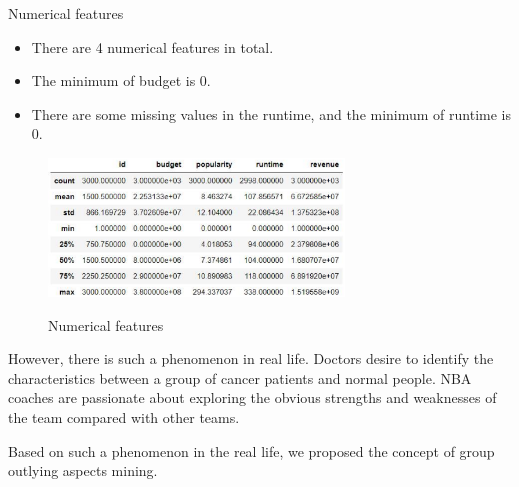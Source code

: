 \documentclass[
 size=12pt,
 paper=smartboard,  %
 mode=present, 		%
 display=slides, 	%
 style=tuliplab,  	%
 pauseslide,
 fleqn,leqno]{powerdot}
\begin{document}
\begin{slide}{Numerical features}
  \begin{itemize}
    \item
    There are 4 numerical features in total. 
    \item 
    The minimum of budget is 0. 
    \item
    There are some missing values in the runtime, and the minimum of runtime is 0.
  \end{itemize}
\vspace{0.75cm}
\begin{figure}[htbp]
  \centering
  \includegraphics[width=0.7\textwidth,height=0.4\textwidth]{figures/describe.eps}\\
  \caption{Numerical features}
\end{figure}

\begin{note}
However,
there is such a phenomenon in real life.
Doctors desire to identify the characteristics between
a group of cancer patients and normal people.
NBA coaches are passionate about exploring the obvious strengths and
weaknesses of the team compared with other teams.

Based on such a phenomenon in the real life,
we proposed the concept of group outlying aspects mining.
\end{note}

\end{slide}
\end{document}
